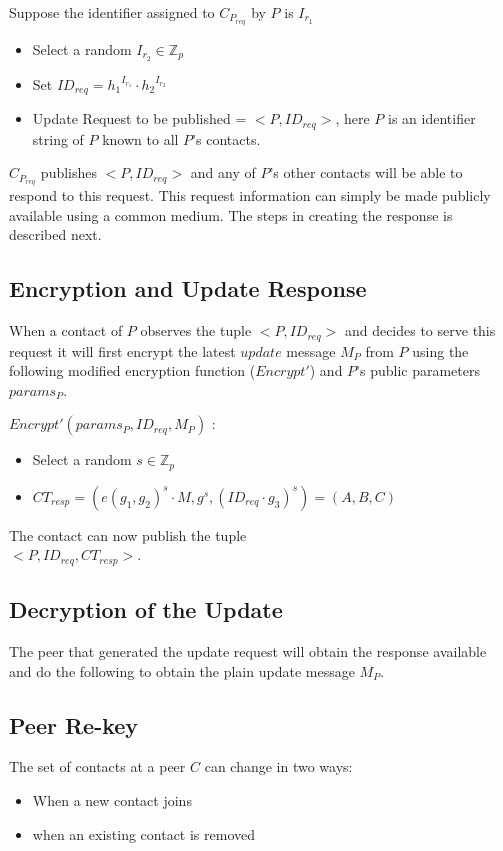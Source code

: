 Suppose the identifier assigned to $C_{P_{req}}$ by $P$ is $I_{r_1}$
\begin{itemize}
\item Select a random $I_{r_2}\in \mathbb{Z}_p$
\item Set $ID_{req} = {h_1}^{I_{r_1}} \cdot {h_2}^{I_{r_2}}$
\item Update Request to be published  = $<P, ID_{req}>$, here $P$ is an identifier string of $P$ known to all $P$'s contacts.
\end{itemize}

$C_{P_{req}}$ publishes $<P, ID_{req}>$ and any of $P$'s other contacts will be able to respond to this request. This request information can simply be made publicly available using a common medium. The steps in creating the response is described next.

\subsection{Encryption and Update Response}
When a contact of $P$ observes the tuple $<P, ID_{req}>$ and decides to serve this request it will first encrypt the latest $update$ message $M_P$ from $P$ using the following modified encryption function ($Encrypt'$) and $P$'s public parameters $params_P$. 

$Encrypt' (params_P, ID_{req}, M_P)$ :

\begin{itemize}
	\item Select a random $s \in \mathbb{Z}_p$ 
	\item $CT_{resp} = (e(g_1, g_2)^s \cdot M,  g^s,  {({ID_{req}} \cdot {g_3})}^s) = (A, B, C)$
\end{itemize}

The contact can now publish the tuple \\$<P, ID_{req}, CT_{resp}>$.

\subsection{Decryption of the Update}
The peer that generated the update request will obtain the response available and do the following to obtain the plain update message $M_P$.




\subsection{Peer Re-key}
The set of contacts at a peer $C$ can change in two ways:
\begin{itemize}
\item When a new contact joins
\item when an existing contact is removed
\end{itemize}


